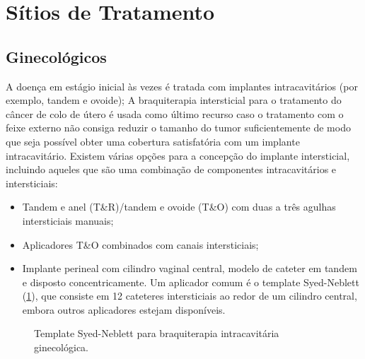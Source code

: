 \documentclass[11pt,a4paper]{article}
\newcounter{exemplo}
\begin{document}
\section{Sítios de Tratamento}

\subsection*{Ginecológicos}

	A doença em estágio inicial às vezes é tratada com implantes intracavitários (por exemplo, tandem e ovoide); A braquiterapia intersticial para o tratamento do câncer de colo de útero é usada como último recurso caso o tratamento com o feixe externo não consiga reduzir o tamanho do tumor suficientemente de modo que seja possível obter uma cobertura satisfatória com um implante intracavitário. Existem várias opções para a concepção do implante intersticial, incluindo aqueles que são uma combinação de componentes intracavitários e intersticiais:
	
	\begin{itemize}[label=\textcolor{CarnationPink}{$\star$}]
		\item Tandem e anel (T\&R)/tandem e ovoide (T\&O) com duas a três agulhas intersticiais manuais;
		\item Aplicadores T\&O  combinados com canais intersticiais;
		\item Implante perineal com cilindro vaginal central, modelo de cateter em tandem e disposto concentricamente. Um aplicador comum é o template Syed-Neblett (\ref{fig:syed}), que consiste em 12 cateteres intersticiais ao redor de um cilindro central, embora outros aplicadores estejam disponíveis.
	\end{itemize}

	\begin{figure}[h]
		\centering
		\caption{Template Syed-Neblett para braquiterapia intracavitária ginecológica.}
		\label{fig:syed}
	\end{figure} 
\end{document}
